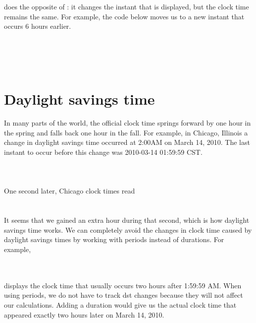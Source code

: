 \documentclass[article]{jss}
\begin{document}
 does the opposite of : it changes the instant that is displayed, but the clock time remains the same. For example, the code below moves us to a new instant that occurs 6 hours earlier.\\

\\
\\
\\
\\


\section{Daylight savings time}
\label{sec:DST}

In many parts of the world, the official clock time springs forward by one hour in the spring and falls back one hour in the fall. For example, in Chicago, Illinois a change in daylight savings time occurred at 2:00AM on March 14, 2010. The last instant to occur before this change was 2010-03-14 01:59:59 CST.\\

\\
\\
\\

One second later, Chicago clock times read\\

\\
\\

It seems that we gained an extra hour during that second, which is how daylight savings time works. We can completely avoid the changes in clock time caused by daylight savings times by working with periods instead of durations. For example,\

\\
\\

displays the clock time that usually occurs two hours after 1:59:59 AM. When using periods, we do not have to track dst changes because they will not affect our calculations. Adding a duration would give us the actual clock time that appeared exactly two hours later on March 14, 2010.
\end{document}
